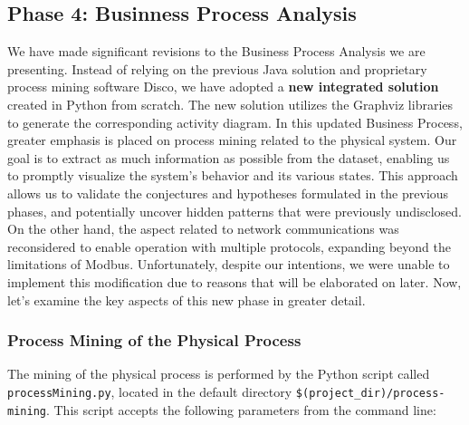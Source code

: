 \subsection{Phase 4: Businness Process Analysis}
\label{subsec:4_improve_bpa}
We have made significant revisions to the Business Process Analysis we are presenting. Instead of relying on the previous Java solution and proprietary process mining software Disco, we have adopted a \textbf{new integrated solution} created in Python from scratch. The new solution utilizes the Graphviz libraries to generate the corresponding activity diagram.\newline \newline
In this updated Business Process, greater emphasis is placed on process mining related to the physical system. Our goal is to extract as much information as possible from the dataset, enabling us to promptly visualize the system's behavior and its various states. This approach allows us to validate the conjectures and hypotheses formulated in the previous phases, and potentially uncover hidden patterns that were previously undisclosed.\newline
On the other hand, the aspect related to network communications was reconsidered to enable operation with multiple protocols, expanding beyond the limitations of Modbus. Unfortunately, despite our intentions, we were unable to implement this modification due to reasons that will be elaborated on later.\newline \newline
Now, let's examine the key aspects of this new phase in greater detail.

\subsubsection{Process Mining of the Physical Process}
\label{subsub:4_proc_minining_phy}

The mining of the physical process is performed by the Python script called \texttt{processMining.py}, located in the default directory \texttt{\$(project\_dir)/process-mining}.\newline
This script accepts the following parameters from the command line:

